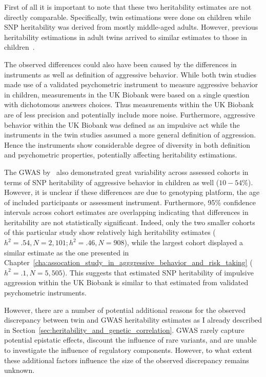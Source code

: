 First of all it is important to note that these two heritability estimates are not directly comparable.
Specifically, twin estimations were done on children while SNP heritability was derived from mostly middle-aged adults.
However, previous heritability estimations in adult twins arrived to similar estimates to those in children~\cite{Miles1997a}.

The observed differences could also have been caused by the differences in  instruments as well as definition of aggressive behavior.
While both  twin studies made use of a validated psychometric instrument to measure aggressive behavior in children, measurements in the UK Biobank were based on a single question with dichotomous answers choices.
Thus measurements within the UK Biobank are of less precision and potentially include more noise.
Furthermore, aggressive behavior within the UK Biobank was defined as an impulsive act while the  instruments in the twin studies assumed a more general definition of aggression.
Hence the  instruments show considerable degree of diversity in both definition and psychometric properties, potentially affecting heritability estimations.

The GWAS by~\citet{Pappa2016a} also demonstrated great variability across assessed cohorts in terms of SNP heritability of aggressive behavior in children as well ($10-54\%$).
However, it is unclear if these differences are due to genotyping platform, the age of included participants or  assessment instrument.
Furthermore, 95\% confidence intervals across cohort estimates are overlapping indicating that differences in heritability are not statistically significant.
Indeed, only the two smaller cohorts of this particular study show relatively high heritability estimates ($h^2=.54, N=2,101; h^2=.46, N=908$), while the largest cohort displayed a similar estimate as the one presented in Chapter~\ref{cha:assocation_study_in_agggressive_behavior_and_risk_taking} ($h^2=.1, N=5,505$).
This suggests that estimated SNP heritability of impulsive aggression within the UK Biobank is similar to that estimated from validated psychometric instruments. 

However, there are a number of potential additional reasons for the observed discrepancy between twin and GWAS heritability estimates as I already described in Section~\ref{sec:heritability_and_genetic_correlation}.
GWAS rarely capture potential epistatic effects, discount the influence of rare variants, and are unable to investigate the influence of regulatory components. 
However, to what extent these additional factors influence the size of the observed discrepancy remains unknown.

